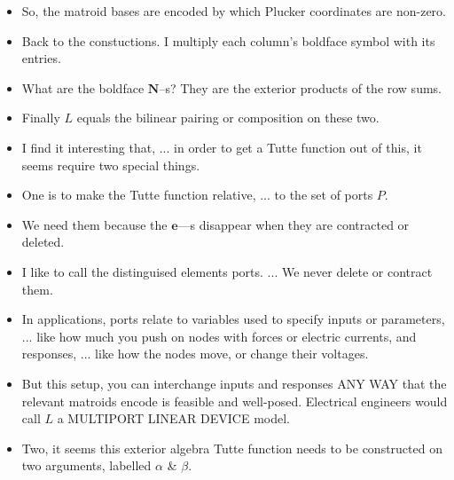 \documentclass[14pt]{extarticle}
\begin{document}
{\begin{itemize}
\item
So, the matroid bases are encoded by which Plucker coordinates are non-zero.

\item
Back to the constuctions.  I multiply each column's boldface symbol with its entries.

\item
  What are the boldface $\mathbf{N}$--s?
  They are the exterior products of the row sums.

\item
  Finally $L$ equals the bilinear pairing or composition on these two.

\item
  I find it interesting that, ... in order to get a Tutte function out
  of this, it seems require two special things.

\item
One is to make the Tutte function relative, ... to the set of ports $P$.

\item
  We need them because the $\mathbf{e}$---s  disappear when they are contracted or deleted.

\item
  I like to call the distinguised elements ports. ... We never delete or contract them.


\item In applications, ports relate to variables used to specify inputs
  or parameters, ... like how much you push on nodes with forces or electric currents,
  and responses, ... like how the nodes move, or change their voltages.

\item But this setup, you can interchange inputs and responses ANY WAY that the
  relevant matroids encode is feasible and well-posed.  Electrical engineers would
  call $L$ a MULTIPORT LINEAR DEVICE model.


\item
  Two, it seems this exterior algebra Tutte function needs to be constructed on 
  two arguments, labelled $\alpha$ \& $\beta$.


\end{itemize}}
\end{document}
